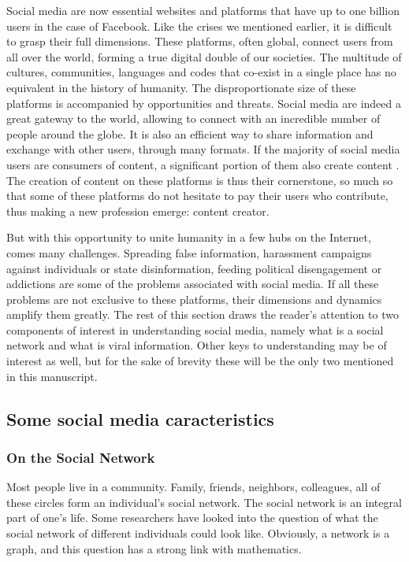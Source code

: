 Social media are now essential websites and platforms that have up to one billion users in the case of Facebook.
Like the crises we mentioned earlier, it is difficult to grasp their full dimensions.
These platforms, often global, connect users from all over the world, forming a true digital double of our societies.
The multitude of cultures, communities, languages and codes that co-exist in a single place has no equivalent in the history of humanity.
The disproportionate size of these platforms is accompanied by opportunities and threats.
Social media are indeed a great gateway to the world, allowing to connect with an incredible number of people around the globe.
It is also an efficient way to share information and exchange with other users, through many formats.
If the majority of social media users are consumers of content, a significant portion of them also create content \textcite{fuchsSocialMediaCritical2021}.
The creation of content on these platforms is thus their cornerstone, so much so that some of these platforms do not hesitate to pay their users who contribute, thus making a new profession emerge: content creator.

But with this opportunity to unite humanity in a few hubs on the Internet, comes many challenges.
Spreading false information, harassment campaigns against individuals or state disinformation, feeding political disengagement or addictions are some of the problems associated with social media.
If all these problems are not exclusive to these platforms, their dimensions and dynamics amplify them greatly.
The rest of this section draws the reader's attention to two components of interest in understanding social media, namely what is a social network and what is viral information.
Other keys to understanding may be of interest as well, but for the sake of brevity these will be the only two mentioned in this manuscript.

\subsection{Some social media caracteristics}
\subsubsection{On the Social Network}
Most people live in a community.
Family, friends, neighbors, colleagues, all of these circles form an individual's social network.
The social network is an integral part of one's life.
Some researchers have looked into the question of what the social network of different individuals could look like.
Obviously, a network is a graph, and this question has a strong link with mathematics.

